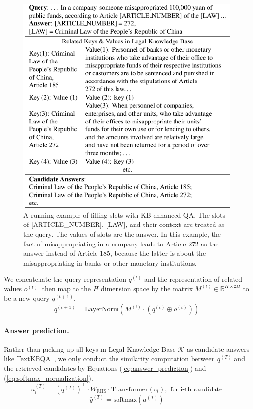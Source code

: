 \documentclass{article}
\begin{document}
\begin{figure}
\centering 
\includegraphics[width=1.0\columnwidth]{img/case.pdf} 
\caption{A running example of filling slots with KB enhanced QA. The slots of [ARTICLE\_NUMBER], [LAW], and their context are treated as the query. The values of slots are the answer. In this example, the fact of misappropriating in a company leads to Article 272 as the answer instead of Article 185, because the latter is about the misappropriating in banks or other monetary institutions.}
\label{fig:running_example} 
\end{figure}


We concatenate the query representation $q^{(t)}$ and the representation of related values $o^{(t)}$, then map to the $H$ dimension space by the matrix $M^{(t)} \in \mathbb{R}^{H\times 2H}$ to be a new query $q^{(t+1)}$.
\begin{equation}
q^{(t+1)} = \text{LayerNorm}( M^{(t)} \cdot (q^{(t)} \oplus o^{(t)} ))
\end{equation}


\paragraph{Answer prediction.} 
Rather than picking up all keys in Legal Knowledge Base $\mathcal{K}$ as candidate answers like TextKBQA~\cite{das-etal-2017-textkbqa}, we only conduct the similarity computation between $q^{(T)}$ and the retrieved candidates by Equations (\ref{eq:answer_prediction}) and (\ref{eq:softmax_normalization}). 
\begin{equation}
a^{(T)}_i = (q^{(T)})^\top \cdot W_{\text{RHS}} \cdot \text{Transformer}(c_i), \text{ for i-th candidate}
\label{eq:answer_prediction}
\end{equation}
\begin{equation}
\hat{y}^{(T)} = \text{softmax}(a^{(T)})
\label{eq:softmax_normalization}
\end{equation}
\end{document}
